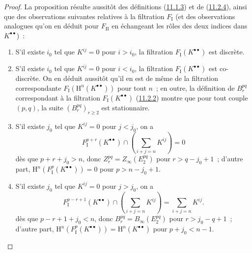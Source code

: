 \begin{proof}
La proposition résulte aussitôt des définitions
(\hyperref[0.11.1.3-fr]{11.1.3}) et de
(\hyperref[0.11.2.4-fr]{11.2.4}), ainsi que des observations suivantes
relatives à la filtration $F_{\mathrm I}$ (et des observations analogues qu'on
en déduit pour $F_{\mathrm{II}}$ en échangeant les rôles des deux indices
dans $K^{\bullet\bullet}$)~:
\begin{enumerate}
  \item[$1^\circ$] S'il existe $i_0$ tel que $K^{ij}=0$ pour $i>i_0$, la
    filtration $F_{\mathrm I}(K^{\bullet\bullet})$ est discrète.
  \item[$2^\circ$] S'il existe $i_0$ tel que $K^{ij}=0$ pour $i<i_0$, la
    filtration $F_{\mathrm I}(K^{\bullet\bullet})$ est co-discrète. On en
    déduit aussitôt qu'il en est de même de la filtration correspondante
    $F_{\mathrm I}(\mathrm H^n(K^{\bullet\bullet}))$ pour tout $n$~; en
    outre, la définition de $B_r^{pq}$ correspondant à la filtration
    $F_{\mathrm I}(K^{\bullet\bullet})$
    (\hyperref[0.11.2.2-fr]{11.2.2}) montre que pour tout couple $(p,q)$, la
    suite $(B_r^{pq})_{r\geq2}$ est stationnaire.
  \item[$3^\circ$] S'il existe $j_0$ tel que $K^{ij}=0$ pour $j<j_0$, on a
    \[
      F_{\mathrm I}^{p+r}(K^{\bullet\bullet})
      \cap\left(\sum_{i+j=n}K^{ij}\right)=0
    \]
    dès que $p+r+j_0>n$, donc
    $Z_r^{pq}=Z_\infty(E_2^{pq})$ pour $r>q-j_0+1$~; d'autre part,
    $\mathrm H^n(F_{\mathrm I}^p(K^{\bullet\bullet}))=0$ pour
    $p>n-j_0+1$.
  \item[$4^\circ$] S'il existe $j_0$ tel que $K^{ij}=0$ pour $j>j_0$, on a
    \[
      F_{\mathrm I}^{p-r+1}(K^{\bullet\bullet})
      \cap\left(\sum_{i+j=n}K^{ij}\right)=\sum_{i+j=n}K^{ij}.
    \]
    dès que $p-r+1+j_0<n$, donc
    $B_r^{pq}=B_\infty(E_2^{pq})$ pour $r>j_0-q+1$~; d'autre part,
    $\mathrm H^n(F_{\mathrm I}^p(K^{\bullet\bullet}))
    =\mathrm H^n(K^{\bullet\bullet})$ pour $p+j_0<n-1$.
\end{enumerate}
\end{proof}

